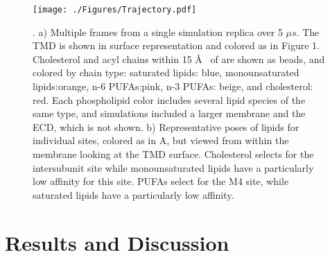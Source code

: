     

 \begin{figure}
	\center
	\texttt{[image: ./Figures/Trajectory.pdf]}
	\caption[A molecular perspective of coarse-grained simulation results] {. a) Multiple frames from a single simulation replica over 5 $\mu s$.   The \nachr{} TMD is shown in surface representation and colored as in Figure 1. Cholesterol and acyl chains within 15 \AA~ of \nachr{} are shown as beads, and colored by chain type: saturated lipids: blue, monounsaturated lipids:orange, n-6 PUFAs:pink, n-3 PUFAs: beige, and cholesterol: red.  Each phospholipid color includes several lipid species of the same type, and simulations included a larger membrane and the ECD, which is not shown.  b) Representative poses of lipids for individual sites, colored as in A, but viewed from within the membrane looking at the TMD surface. Cholesterol selects for the intersubunit site while monounsaturated lipids have a particularly low affinity for this site. PUFAs select for the M4 site, while saturated lipids have a particularly low affinity.}
	\label{fig:trj}
\end{figure}

\section{Results and Discussion}
\label{res}

